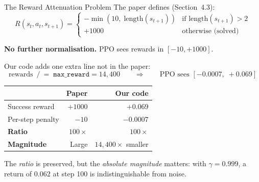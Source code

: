 \documentclass[aspectratio=169,11pt]{beamer}
\begin{document}
\begin{frame}{The Reward Attenuation Problem}
  \small
  The paper defines (Section~4.3):
  \[
    R(s_t, a_t, s_{t+1}) = \begin{cases}
      -\min(10,\; \mathrm{length}(s_{t+1})) & \text{if } \mathrm{length}(s_{t+1}) > 2 \\
      +1000 & \text{otherwise (solved)}
    \end{cases}
  \]

  \textbf{No further normalisation.}  PPO sees rewards in $[-10, +1000]$.

  \medskip
  Our code adds \alert{one extra line not in the paper}:
  \[
    \text{rewards} \;\mathrel{/}= \;\texttt{max\_reward} = 14{,}400
    \qquad\Longrightarrow\qquad
    \text{PPO sees } [-0.0007,\; +0.069]
  \]

  \begin{center}
    \begin{tabular}{lrr}
      \toprule
      & \textbf{Paper} & \textbf{Our code} \\
      \midrule
      Success reward     & $+1000$  & $+0.069$ \\
      Per-step penalty   & $-10$    & $-0.0007$ \\
      \textbf{Ratio}     & $100\times$ & $100\times$ \\
      \textbf{Magnitude} & \textcolor{good}{Large} & \textcolor{bad}{$14{,}400\times$ smaller} \\
      \bottomrule
    \end{tabular}
  \end{center}

  \smallskip
  {\scriptsize The \emph{ratio} is preserved, but the \emph{absolute magnitude} matters:
  with $\gamma=0.999$, a return of $0.062$ at step 100 is indistinguishable from noise.}
\end{frame}
\end{document}
